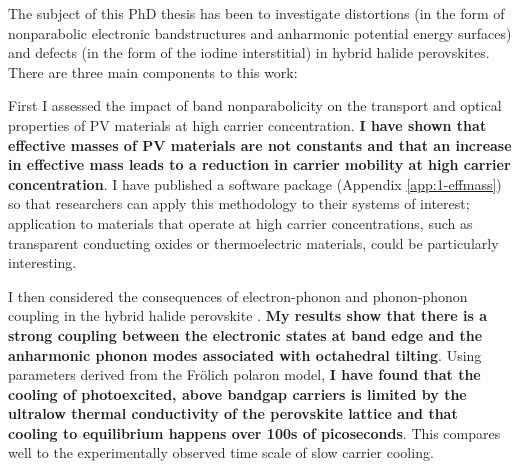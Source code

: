 The subject of this PhD thesis has been to investigate distortions (in the form of nonparabolic electronic bandstructures and anharmonic potential energy surfaces) and defects (in the form of the iodine interstitial) in hybrid halide perovskites. There are three main components to this work:

First I assessed the impact of band nonparabolicity on the transport and optical properties of PV materials at high carrier concentration. \textbf{I have shown that effective masses of PV materials are not constants and that an increase in effective mass leads to a reduction in carrier mobility at high carrier concentration}. I have published a software package (Appendix \ref{app:1-effmass}) so that researchers can apply this methodology to their systems of interest; application to materials that operate at high carrier concentrations, such as transparent conducting oxides or thermoelectric materials, could be particularly interesting.

I then considered the consequences of electron-phonon and phonon-phonon coupling in the hybrid halide perovskite . \textbf{My results show that there is a strong coupling between the electronic states at band edge and the anharmonic phonon modes associated with octahedral tilting}. Using parameters derived from the Fr\"{o}lich polaron model, \textbf{I have found that the cooling of photoexcited, above bandgap carriers is limited by the ultralow thermal conductivity of the perovskite lattice and that cooling to equilibrium happens over 100s of picoseconds}. This compares well to the experimentally observed time scale of slow carrier cooling.

